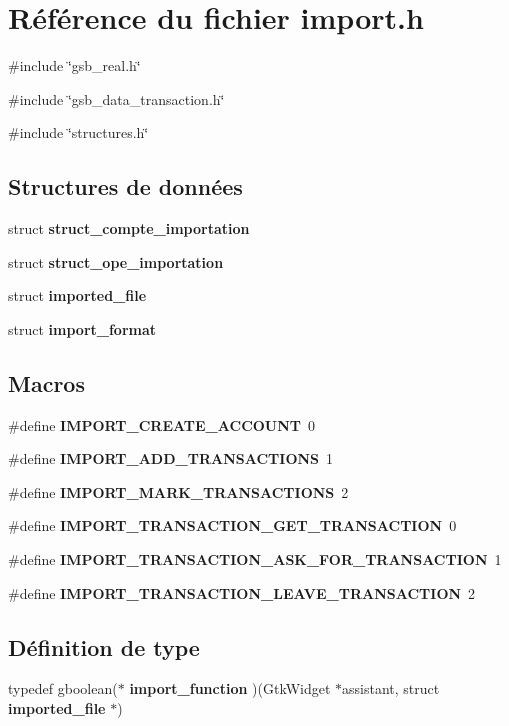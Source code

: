 \section{Référence du fichier import.h}
\label{import_8h}
{\ttfamily \#include \char`\"{}gsb\_\-real.h\char`\"{}}\par
{\ttfamily \#include \char`\"{}gsb\_\-data\_\-transaction.h\char`\"{}}\par
{\ttfamily \#include \char`\"{}structures.h\char`\"{}}\par
\subsection*{Structures de données}
\begin{DoxyCompactItemize}
\item 
struct {\bf struct\_\-compte\_\-importation}
\item 
struct {\bf struct\_\-ope\_\-importation}
\item 
struct {\bf imported\_\-file}
\item 
struct {\bf import\_\-format}
\end{DoxyCompactItemize}
\subsection*{Macros}
\begin{DoxyCompactItemize}
\item 
\#define {\bf IMPORT\_\-CREATE\_\-ACCOUNT}~0
\item 
\#define {\bf IMPORT\_\-ADD\_\-TRANSACTIONS}~1
\item 
\#define {\bf IMPORT\_\-MARK\_\-TRANSACTIONS}~2
\item 
\#define {\bf IMPORT\_\-TRANSACTION\_\-GET\_\-TRANSACTION}~0
\item 
\#define {\bf IMPORT\_\-TRANSACTION\_\-ASK\_\-FOR\_\-TRANSACTION}~1
\item 
\#define {\bf IMPORT\_\-TRANSACTION\_\-LEAVE\_\-TRANSACTION}~2
\end{DoxyCompactItemize}
\subsection*{Définition de type}
\begin{DoxyCompactItemize}
\item 
typedef gboolean($\ast$ {\bf import\_\-function} )(GtkWidget $\ast$assistant, struct {\bf imported\_\-file} $\ast$)
\end{DoxyCompactItemize}
